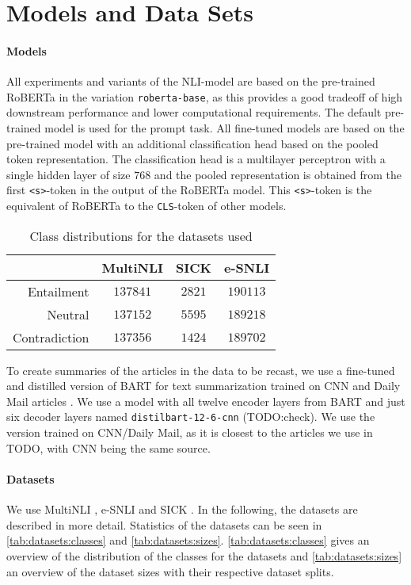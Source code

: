\section{Models and Data Sets} \label{sec:models_datasets}
\paragraph{Models}
All experiments and variants of the \acs{NLI}-model are based on the pre-trained \acf{RoBERTa} \cite{roberta} in the variation \texttt{roberta-base}, as this provides a good tradeoff of high downstream performance and lower computational requirements. The default pre-trained model is used for the prompt task. All fine-tuned models are based on the pre-trained model with an additional classification head based on the pooled token representation. The classification head is a multilayer perceptron with a single hidden layer of size $768$ and the pooled representation is obtained from the first \texttt{<s>}-token in the output of the \acs{RoBERTa} model. This \texttt{<s>}-token is the equivalent of \acs{RoBERTa} to the \texttt{CLS}-token of other models.

\begin{table}[ht]
    \centering
    \caption{Class distributions for the datasets used}
    \begin{tabular}{r || c | c | c}
        & \acs{MultiNLI} & \acs{SICK} & \acs{e-SNLI} \\
        \hline
        Entailment & $137841$ & $2821$ & $190113$ \\
        Neutral & $137152$ & $5595$ & $189218$ \\
        Contradiction & $137356$ & $1424$ & $189702$
    \end{tabular}
    \label{tab:datasets:classes}
\end{table}

To create summaries of the articles in the data to be recast, we use a fine-tuned and distilled version of BART \cite{lewis-etal-2020-bart} for text summarization trained on CNN and Daily Mail articles \cite{cnn1,cnn2}. \cite{shleifer2020pretrained} We use a model with all twelve encoder layers from BART and just six decoder layers named \texttt{distilbart-12-6-cnn} (TODO:check). We use the version trained on CNN/Daily Mail, as it is closest to the articles we use in TODO, with CNN being the same source.

\paragraph{Datasets} We use \acs{MultiNLI} \cite{multinli}, \acs{e-SNLI} \cite{esnli} and \acs{SICK} \cite{sick}. In the following, the datasets are described in more detail. Statistics of the datasets can be seen in \autoref{tab:datasets:classes} and \autoref{tab:datasets:sizes}. \autoref{tab:datasets:classes} gives an overview of the distribution of the classes for the datasets and \autoref{tab:datasets:sizes} an overview of the dataset sizes with their respective dataset splits.

